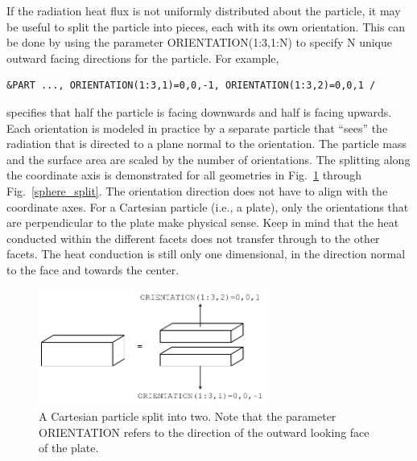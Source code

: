 \documentclass[11pt]{book}
\begin{document}
If the radiation heat flux is not uniformly distributed about the particle, it may be useful to split the particle into pieces, each with its own orientation. This can be done by using the parameter {\ct ORIENTATION(1:3,1:N)} to specify {\ct N} unique outward facing directions for the particle. For example,
\begin{lstlisting}
&PART ..., ORIENTATION(1:3,1)=0,0,-1, ORIENTATION(1:3,2)=0,0,1 /
\end{lstlisting}
specifies that half the particle is facing downwards and half is facing upwards.  Each orientation is modeled in practice by a separate particle that ``sees'' the radiation that is directed to a plane normal to the orientation. The particle mass and the surface area are scaled by the number of orientations. The splitting along the coordinate axis is demonstrated for all geometries in Fig.~\ref{cart_split} through Fig.~\ref{sphere_split}. The orientation direction does not have to align with the coordinate axes. For a Cartesian particle (i.e., a plate), only the orientations that are perpendicular to the plate make physical sense. Keep in mind that the heat conducted within the different facets does not transfer through to the other facets. The heat conduction is still only one dimensional, in the direction normal to the face and towards the center.

\begin{figure}[ht]
\begin{center}
\includegraphics[height=1.5in]{FIGURES/FDS_User_Guide_Cartesian_Particle_Drawing}
\end{center}
\caption[Cartesian particle split in two directions]{A Cartesian particle split into two. Note that the parameter {\ct ORIENTATION} refers to the direction of the outward looking face of the plate.}
\label{cart_split}
\end{figure}
\end{document}

